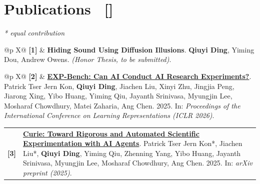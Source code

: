 \documentclass[11pt,a4paper]{article}
\makeatletter
\newlength{\paperlabelwd}
\newcommand{\paperrow}[2]{%
  \vspace{4pt}%
  \noindent\begingroup\setlength{\tabcolsep}{0pt}%
  \begin{tabularx}{\linewidth}{@{}p{\paperlabelwd} X@{}}%
    #1 & #2%
  \end{tabularx}\par\endgroup
}
\newcommand{\pubitem}[2]{%
  \paperrow{\textbf{#1}}{#2}
}
\makeatother
\begin{document}
\section{Publications \ [\texorpdfstring{\href{https://scholar.google.com/citations?hl=en&user=sn4ACXUAAAAJ}{\faGoogle}}{Google Scholar}]}
\textit{* equal contribution}

\pubitem{[1]}{\textcolor{linkblue}{\textbf{Hiding Sound Using Diffusion Illusions}}. \textbf{Qiuyi Ding}, Yiming Dou, Andrew Owens. \textit{(Honor Thesis, to be submitted)}.}
\pubitem{[2]}{\href{https://arxiv.org/abs/2505.24785}{\textbf{EXP-Bench: Can AI Conduct AI Research Experiments?}}. Patrick Tser Jern Kon, \textbf{Qiuyi Ding}, Jiachen Liu, Xinyi Zhu, Jingjia Peng, Jiarong Xing, Yibo Huang, Yiming Qiu, Jayanth Srinivasa, Myungjin Lee, Mosharaf Chowdhury, Matei Zaharia, Ang Chen. 2025. In: \textit{Proceedings of the International Conference on Learning Representations (ICLR 2026)}.}
\pubitem{[3]}{\href{https://arxiv.org/abs/2502.16069}{\textbf{Curie: Toward Rigorous and Automated Scientific Experimentation with AI Agents}}. Patrick Tser Jern Kon*, Jiachen Liu*, \textbf{Qiuyi Ding}, Yiming Qiu, Zhenning Yang, Yibo Huang, Jayanth Srinivasa, Myungjin Lee, Mosharaf Chowdhury, Ang Chen. 2025. In: \textit{arXiv preprint (2025)}.}

\end{document}
